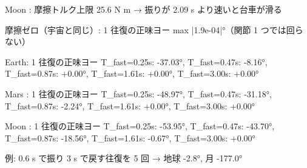 {  Moon : 摩擦トルク上限   25.6 N m → 振りが 2.09 s より速いと台車が滑る\par
  摩擦ゼロ（宇宙と同じ）: 1 往復の正味ヨー max |1.9e-04|°（関節 1 つでは回らない）\par
  Earth: 1 往復の正味ヨー  T\_fast=0.25s: -37.03°, T\_fast=0.47s:  -8.16°, T\_fast=0.87s:  +0.00°, T\_fast=1.61s:  +0.00°, T\_fast=3.00s:  +0.00°\par
  Mars : 1 往復の正味ヨー  T\_fast=0.25s: -48.97°, T\_fast=0.47s: -31.18°, T\_fast=0.87s:  -2.24°, T\_fast=1.61s:  +0.00°, T\_fast=3.00s:  +0.00°\par
  Moon : 1 往復の正味ヨー  T\_fast=0.25s: -53.95°, T\_fast=0.47s: -43.70°, T\_fast=0.87s: -18.56°, T\_fast=1.61s:  -0.67°, T\_fast=3.00s:  +0.00°\par
  例: 0.6 s で振り 3 s で戻す往復を 5 回 → 地球 -2.8°, 月 -177.0°\par
}

